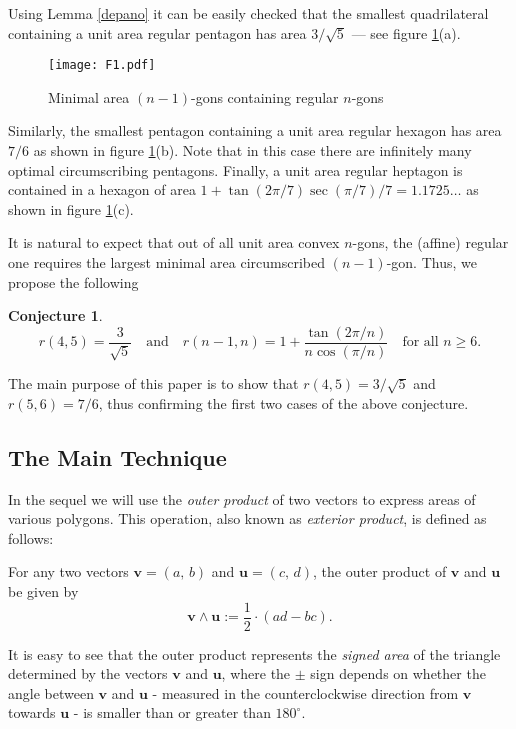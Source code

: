 \documentclass [10pt,oneside]{amsart}
\theoremstyle{definition}
\theoremstyle{plain}
\newtheorem{conj}[df]{Conjecture}
\begin{document}
Using Lemma \ref{depano} it can be easily checked that the smallest quadrilateral containing a unit area regular pentagon has area $3/\sqrt{5}$ --- see figure \ref{fig1}(a).

\begin{figure}[ht]
\centering
\texttt{[image: F1.pdf]}
\vspace{-1cm}
\caption{\small{Minimal area $(n-1)$-gons containing regular $n$-gons}}
\label{fig1}
\end{figure}

Similarly, the smallest pentagon containing a unit area regular hexagon has area $7/6$ as shown in figure \ref{fig1}(b). Note that in this case there are infinitely many optimal circumscribing pentagons. Finally, a unit area regular heptagon is contained in a hexagon of area $1+\tan(2\pi/7)\sec(\pi/7)/7=1.1725\dots$ as shown in figure \ref{fig1}(c).

It is natural to expect that out of all unit area convex $n$-gons, the (affine) regular one requires the largest minimal area circumscribed $(n-1)$-gon.
Thus, we propose the following
\begin{conj}
\begin{equation}
r(4,5)= \frac{3}{\sqrt{5}} \quad \text{and}  \quad r(n-1, n)= 1+\frac{\tan(2\pi/n)}{n\cos(\pi/n)}\quad \text{for all} \,\,  n\ge 6.
\end{equation}
\end{conj}

The main purpose of this paper is to show that $r(4,5)=3/\sqrt{5}$ and $r(5,6)=7/6$, thus confirming the first two cases of the above conjecture.


\subsection{\bf The Main Technique}

In the sequel we will use the \emph{outer product} of two vectors to express areas of various polygons. This
operation, also known as \emph{exterior product}, is defined as follows:

For any two vectors $\mathbf{v}=(a,
\, b)$ and $\mathbf{u}=(c,\,d)$, the outer product of $\mathbf{v}$ and $\mathbf{u}$ be given by
$$\mathbf{v}\wedge \mathbf{u}:=\frac{1}{2}\cdot (ad-bc).$$

It is easy to see that the outer product represents the \emph{signed
area} of the triangle determined by the vectors $\mathbf{v}$ and
$\mathbf{u}$, where the $\pm$ sign depends on whether the angle
between $\mathbf{v}$ and $\mathbf{u}$ - measured in the
counterclockwise direction from $\mathbf{v}$ towards $\mathbf{u}$ -
is smaller than or greater than $180^{\circ}$.
\end{document}
